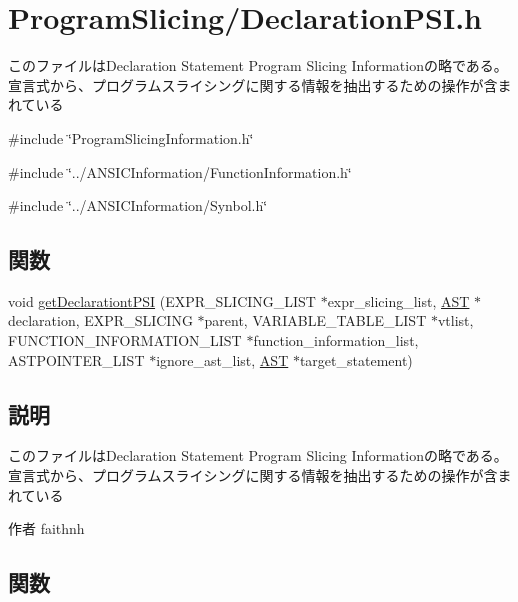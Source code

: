 \section{ProgramSlicing/DeclarationPSI.h}
\label{DeclarationPSI_8h}


このファイルはDeclaration Statement Program Slicing Informationの略である。 宣言式から、プログラムスライシングに関する情報を抽出するための操作が含まれている  


{\ttfamily \#include \char`\"{}ProgramSlicingInformation.h\char`\"{}}\par
{\ttfamily \#include \char`\"{}../ANSICInformation/FunctionInformation.h\char`\"{}}\par
{\ttfamily \#include \char`\"{}../ANSICInformation/Synbol.h\char`\"{}}\par
\subsection*{関数}
\begin{DoxyCompactItemize}
\item 
void \hyperlink{DeclarationPSI_8h_a84e0b014b44675ec9ba51fe3ed31062f}{getDeclarationtPSI} (EXPR\_\-SLICING\_\-LIST $\ast$expr\_\-slicing\_\-list, \hyperlink{structabstract__syntax__tree}{AST} $\ast$declaration, EXPR\_\-SLICING $\ast$parent, VARIABLE\_\-TABLE\_\-LIST $\ast$vtlist, FUNCTION\_\-INFORMATION\_\-LIST $\ast$function\_\-information\_\-list, ASTPOINTER\_\-LIST $\ast$ignore\_\-ast\_\-list, \hyperlink{structabstract__syntax__tree}{AST} $\ast$target\_\-statement)
\end{DoxyCompactItemize}


\subsection{説明}
このファイルはDeclaration Statement Program Slicing Informationの略である。 宣言式から、プログラムスライシングに関する情報を抽出するための操作が含まれている \begin{DoxyAuthor}{作者}
faithnh 
\end{DoxyAuthor}


\subsection{関数}
